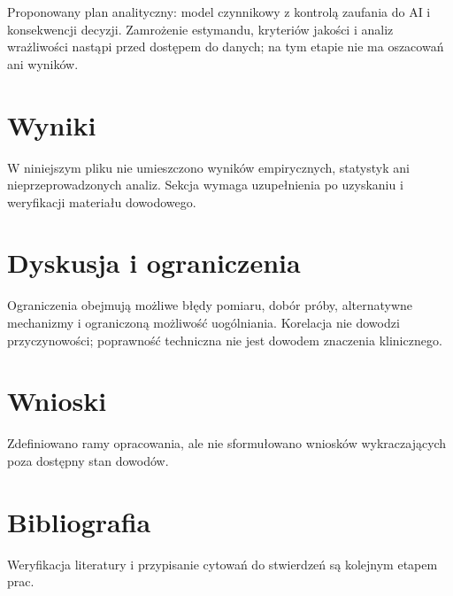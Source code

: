 \documentclass[11pt,a4paper]{article}
\begin{document}
Proponowany plan analityczny: model czynnikowy z kontrolą zaufania do AI i konsekwencji decyzji. Zamrożenie estymandu, kryteriów jakości i analiz wrażliwości nastąpi przed dostępem do danych; na tym etapie nie ma oszacowań ani wyników.

\section{Wyniki}

W niniejszym pliku nie umieszczono wyników empirycznych, statystyk ani nieprzeprowadzonych analiz. Sekcja wymaga uzupełnienia po uzyskaniu i weryfikacji materiału dowodowego.

\section{Dyskusja i ograniczenia}

Ograniczenia obejmują możliwe błędy pomiaru, dobór próby, alternatywne mechanizmy i ograniczoną możliwość uogólniania. Korelacja nie dowodzi przyczynowości; poprawność techniczna nie jest dowodem znaczenia klinicznego.

\section{Wnioski}

Zdefiniowano ramy opracowania, ale nie sformułowano wniosków wykraczających poza dostępny stan dowodów.

\section*{Bibliografia}

Weryfikacja literatury i przypisanie cytowań do stwierdzeń są kolejnym etapem prac.
\end{document}
